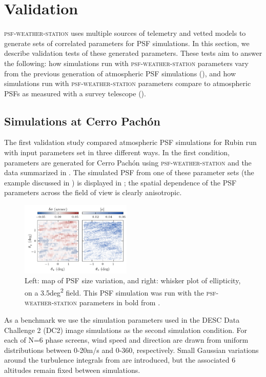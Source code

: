\documentclass[twocolumn]{aastex631}
\newcommand{\psfws}{\textsc{psf-weather-station}\xspace}
\begin{document}
\section{Validation} \label{sec:valid}
\psfws uses multiple sources of telemetry and vetted models to generate sets of correlated parameters for PSF simulations.
In this section, we describe validation tests of these generated parameters.
These tests aim to answer the following: how simulations run with \psfws parameters vary from the previous generation of atmospheric PSF simulations (), and how simulations run with \psfws parameters compare to atmospheric PSFs as measured with a survey telescope ().

\subsection{Simulations at Cerro Pach\'on}\label{sec:imsimcompare}
The first validation study compared atmospheric PSF simulations for Rubin run with input parameters set in three different ways.
In the first condition, parameters are generated for Cerro Pachón using \psfws and the data summarized in .
The simulated PSF from one of these parameter sets (the example discussed in ) is displayed in ; the spatial dependence of the PSF parameters across the field of view is clearly anisotropic. 

\begin{figure}
\includegraphics[width=0.47\textwidth]{example_output.png}
\caption{Left: map of PSF size variation, and right: whisker plot of ellipticity, on a 3.5\unit{deg^2} field.
This PSF simulation was run with the \psfws parameters in bold from .
    \label{fig:output}
    }
\end{figure}

As a benchmark we use the simulation parameters used in the DESC Data Challenge 2 (DC2) image simulations \citep{the_lsst_dark_energy_science_collaboration_lsst_2021} as the second simulation condition.
For each of N=6 phase screens, wind speed and direction are drawn from uniform distributions between 0-20\unit{m/s} and 0-360\degree, respectively.
Small Gaussian variations around the turbulence integrals from \cite{ellerbroek_efficient_2002} are introduced, but the associated 6 altitudes remain fixed between simulations.
\end{document}
